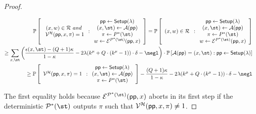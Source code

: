 \begin{proof}
	 \begin{small}
 \begin{align*}
	\mathbb{P} \left[
	\begin{array}{c} 
	(x,w) \in \mathcal{R} \ and \\\ 
    \verifier^\mathcal{H}(\crs, x, \pi) = 1 
	\end{array} : 
	\begin{array}{c}
	\crs \gets \setup(\lambda) \\
	(x, \st) \gets \mathcal{A}(\crs) \\ 
	\pi \gets P^*(\st) \\ 
	w \gets \mathcal{E}^{P^*(\st)}(\crs, x) 
	\end{array}
 \right] = \mathbb{P} \left[
	\begin{array}{c} 
	(x,w) \in \mathcal{R}  
	\end{array} : 
	\begin{array}{c}
	\crs \gets \setup(\lambda) \\
	(x, \st) \gets \mathcal{A}(\crs) \\ 
	\pi \gets P^*(\st) \\ 
	w \gets \mathcal{E}^{P^*(\st)}(\crs, x) 
	\end{array}
 \right] \\   
 \geq \sum_{x, \st} \left(\frac{\epsilon(x, \st) - (Q+1)\kappa}{1-\kappa} - 2\lambda (k^\mu + Q \cdot (k^\mu - 1))\cdot \delta - \negl\right) \cdot \mathbb{P} \left[ \mathcal{A}(\crs) = (x, \st) :
	\crs \gets \setup(\lambda) \right] \\
 \geq \mathbb{P} \left[
	\begin{array}{c} 
	\verifier^\mathcal{H}(\crs, x, \pi) = 1 
	\end{array} : 
	\begin{array}{c}
	\crs \gets \setup(\lambda) \\
	(x, \st) \gets \mathcal{A}(\crs) \\ 
	\pi \gets P^*(\st) \\ 
	\end{array}
 \right] - \frac{(Q+1)\kappa}{1- \kappa} -2\lambda (k^\mu + Q \cdot (k^\mu - 1)) \cdot \delta - \negl
	\end{align*}
	\end{small}

The first equality holds because $\mathcal{E}^{\prover^*(\st)}(\crs, x)$ aborts in its first step if the deterministic $\prover^*(\st)$ outputs $\pi$ such that $\mathcal{V}^\mathcal{H}(\textsf{pp}, x, \pi) \neq 1$. %
	 \end{proof}


